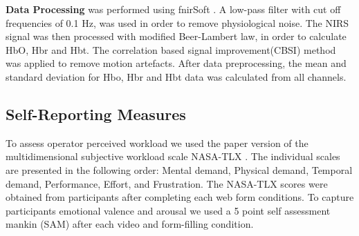 \documentclass[../main/Feedback.tex]{subfiles}
\begin{document}
\textbf{Data Processing} was performed using fnirSoft \cite{ayazfunctional}. 
A low-pass filter with cut off frequencies of 0.1 Hz, was used in order to remove physiological noise.
The NIRS signal was then processed with modified Beer-Lambert law\cite{cope1988system}, in order to calculate HbO, Hbr and Hbt.  
The correlation based signal improvement(CBSI) \cite{cui2010functional} method was applied to remove motion artefacts.
After data preprocessing, the mean and standard deviation for Hbo, Hbr and Hbt data was calculated from all channels.


\subsection{Self-Reporting Measures}
To assess operator perceived workload we used the paper version of the multidimensional subjective workload scale NASA-TLX \cite{nasatlx}.
The individual scales are presented in the following order: Mental demand, Physical demand, Temporal demand, Performance, Effort, and Frustration.
The NASA-TLX scores were obtained from participants after completing each web form conditions. To capture participants emotional valence and arousal we used a 5 point self assessment mankin (SAM)\cite{bradley1994measuring} after each video and form-filling condition.  
\end{document}
